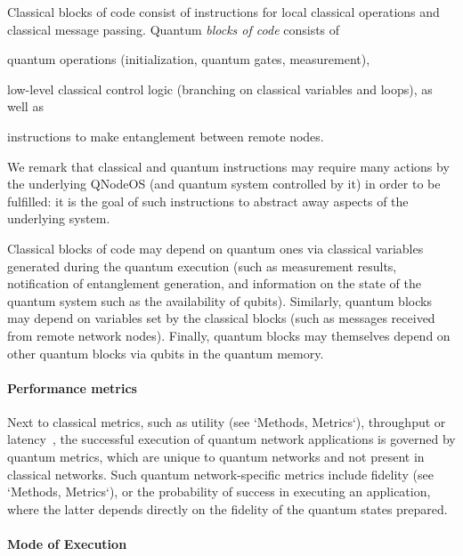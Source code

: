 Classical blocks of code consist of instructions for local classical operations and classical message passing. Quantum \emph{blocks of code} consists of
%
\begin{inlinelist}
\item quantum operations (initialization, quantum gates, measurement), 
\item low-level classical control logic (branching on classical variables and loops), as well as 
\item instructions to make entanglement between remote nodes. 
\end{inlinelist}
%
We remark that classical and quantum instructions may require many actions by the underlying \ac{QNodeOS} (and quantum system controlled by it) in order to be fulfilled: it is the goal of such instructions to abstract away aspects of the underlying system.

Classical blocks of code may depend on quantum ones via classical variables generated during the quantum execution (such as measurement results, notification of entanglement generation, and information on the state of the quantum system such as the availability of qubits). Similarly, quantum blocks may depend on variables set by the classical blocks (such as messages received from remote network nodes). Finally, quantum blocks may themselves depend on other quantum blocks via qubits in the quantum memory. 

\paragraph{Performance metrics}

Next to classical metrics, such as utility (see `Methods, Metrics`), throughput or latency~\cite{stankiewicz_commag}, the successful execution of quantum network applications is governed by quantum metrics, which are unique to quantum networks and not present in classical networks. Such quantum network-specific metrics include fidelity (see `Methods, Metrics`), or the probability of success in executing an application, where the latter depends directly on the fidelity of the quantum states prepared.

\paragraph{Mode of Execution}

